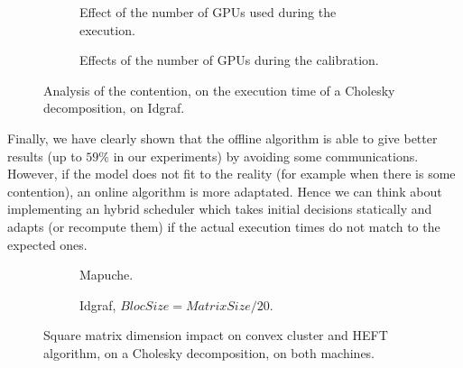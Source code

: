 \documentclass[10pt, conference, compsocconf,pdftex,dvipsnames]{IEEEtran}
\begin{document}
\begin{figure}[htb]
    \centering
    \begin{subfigure}{0.5\textwidth}
        \scalebox{0.6}{
            
        }
        \caption{Effect of the number of GPUs used during the execution.}
        \label{fig:ContentionGpu}
    \end{subfigure}
    \begin{subfigure}{0.5\textwidth}
        \scalebox{0.6}{
            \centering
            
        }
        \caption{Effects of the number of GPUs during the calibration.}
        \label{fig:ContentionTrick}
    \end{subfigure}
    \label{fig:Contention}
    \caption{Analysis of the contention, on the execution time of a 
    Cholesky decomposition, on Idgraf.}

\end{figure}

Finally, we have clearly shown that the offline algorithm is able to give
better results (up to $59\%$ in our experiments) by avoiding some
communications. However, if the model does not fit to the reality (for example
when there is some contention), an online algorithm is more adaptated. Hence
we can think about implementing an hybrid scheduler which takes initial
decisions statically and adapts (or recompute them) if the actual execution
times do not match to the expected ones.

\begin{figure}[t!]
    \centering
    \begin{subfigure}{0.4\textwidth}
        \hspace{-20pt}
        \scalebox{0.6}{
            
        }
        \caption{Mapuche.}
        \label{fig:MatMapuche}
    \end{subfigure}
    \hspace{15pt}
    \begin{subfigure}{0.55\textwidth}
        \scalebox{0.6}{
            
        }
        \caption{Idgraf, $BlocSize=MatrixSize/20$.}
        \label{fig:MatIdgraf}
    \end{subfigure}

    \caption{Square matrix dimension impact on convex cluster and HEFT
    algorithm, on a Cholesky decomposition, on both machines.}
    \label{fig:Mat}
\end{figure}
\end{document}
